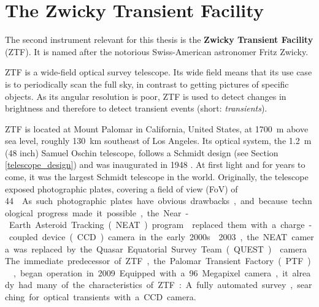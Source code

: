 \chapter{The Zwicky Transient Facility} \label{ztf}
The second instrument relevant for this thesis is the \textbf{Zwicky Transient Facility} (ZTF). It is named after the notorious Swiss-American astronomer Fritz Zwicky.

ZTF is a wide-field optical survey telescope. Its wide field means that its use case is to periodically scan the full sky, in contrast to getting pictures of specific objects. As its angular resolution is poor, ZTF is used to detect changes in brightness and therefore to detect transient events (short: \textit{transients}).

 ZTF is located at Mount Palomar in California, United States, at \SI{1700}{\m} above sea level, roughly \SI{130}{\km} southeast of Los Angeles. Its optical system, the \SI{1.2}{\m} (48 inch) Samuel Oschin telescope, follows a Schmidt design (see Section \ref{telescope_design}) and was inaugurated in 1948 \cite{Harrington1952}. At first light and for years to come, it was the largest Schmidt telescope in the world. Originally, the telescope exposed photographic plates, covering a field of view (FoV) of \SI{44}{\square\deg}. As such photographic plates have obvious drawbacks, and because technological progress made it possible, the Near-Earth Asteroid Tracking (NEAT) program  replaced them with a charge-coupled device (CCD) camera in the early 2000s.

2003, the NEAT camera was replaced by the Quasar Equatorial Survey Team (QUEST)  camera. The immediate predecessor of ZTF, the Palomar Transient Factory (PTF) , began operation in 2009. Equipped with a 96 Megapixel camera, it already had many of the characteristics of ZTF: A fully automated survey, searching for optical transients with a CCD camera.

